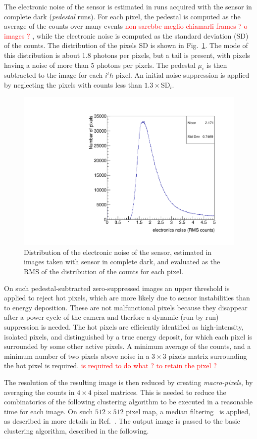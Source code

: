 The electronic noise of the sensor is estimated in runs acquired
with the sensor in complete dark ({\it pedestal} runs). For each
pixel, the pedestal is computed as the average of the counts over many
events \textcolor{red}{non sarebbe meglio chiamarli frames ? o images ? }, while the electronic noise is computed as the standard deviation
(SD) of the counts. The distribution of the pixels SD is shown in
Fig.~\ref{fig:noise}. The mode of this distribution is about 1.8
photons per pixels, but a tail is present, with pixels having a
 noise of more than 5 photons per pixels.
The pedestal $\mu_i$ is then subtracted to the image for each $i^th$ pixel.
An initial noise suppression is applied by neglecting the pixels with counts less than $1.3\times\textrm{SD}_i$.
%
\begin{figure}[ht]
  \centering
  \includegraphics[width=0.45\linewidth]{figures/sensor_noise}
  \caption{Distribution of the electronic noise of the sensor,
    estimated in images taken with sensor in complete dark, and
    evaluated as the RMS of the distribution of the counts for each
    pixel.  \label{fig:noise}}
\end{figure}
%
On such pedestal-subtracted zero-suppressed images  an upper
threshold is applied to reject hot pixels, which are more likely due
to sensor instabilities than to energy deposition. These are not
malfunctional pixels  because they disappear after a
power cycle of the camera and therfore a dynamic (run-by-run) suppression is
needed.  The hot pixels are efficiently identified as high-intensity, isolated
pixels, and distinguished by a true energy deposit, for which each
pixel is surrounded by some other active pixels. A minimum average of
the counts, and a minimum number of two pixels above noise in a
$3\times3$ pixels matrix surrounding the hot pixel is required.
\textcolor{red}{is required to do what ? to retain the pixel ?}

The resolution of the resulting image is then reduced by creating
\textit{macro-pixels}, by averaging the counts in $4\times4$ pixel
matrices. This is needed to reduce the combinatorics   of the following
clustering algorithm to be executed   in a reasonable time for each
image. On such $512\times512$ pixel map, a median
filtering~\cite{medianfilter} is applied, as described in more details
in Ref.~\cite{medianfilter_cygno}. The output image is passed to the
basic clustering algorithm, described in the following.



